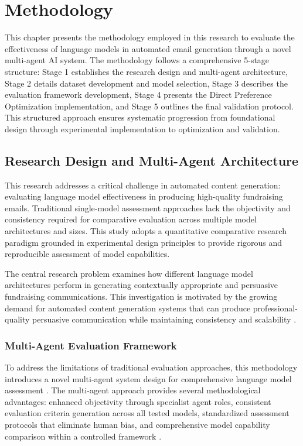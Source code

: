 \chapter{Methodology}
\label{sec:methodology}

This chapter presents the methodology employed in this research to evaluate the effectiveness of language models in automated email generation through a novel multi-agent AI system. The methodology follows a comprehensive 5-stage structure: Stage 1 establishes the research design and multi-agent architecture, Stage 2 details dataset development and model selection, Stage 3 describes the evaluation framework development, Stage 4 presents the Direct Preference Optimization implementation, and Stage 5 outlines the final validation protocol. This structured approach ensures systematic progression from foundational design through experimental implementation to optimization and validation.

\section{Research Design and Multi-Agent Architecture}
\label{sec:research-design-architecture}

This research addresses a critical challenge in automated content generation: evaluating language model effectiveness in producing high-quality fundraising emails. Traditional single-model assessment approaches lack the objectivity and consistency required for comparative evaluation across multiple model architectures and sizes. This study adopts a quantitative comparative research paradigm grounded in experimental design principles to provide rigorous and reproducible assessment of model capabilities.

The central research problem examines how different language model architectures perform in generating contextually appropriate and persuasive fundraising communications. This investigation is motivated by the growing demand for automated content generation systems that can produce professional-quality persuasive communication while maintaining consistency and scalability \cite{murakami2023nlg_advertising, zheng2023click_controllable}.

\subsection{Multi-Agent Evaluation Framework}

To address the limitations of traditional evaluation approaches, this methodology introduces a novel multi-agent system design for comprehensive language model assessment \cite{guo2024llm_multiagent, yan2025beyond_selftalk}. The multi-agent approach provides several methodological advantages: enhanced objectivity through specialist agent roles, consistent evaluation criteria generation across all tested models, standardized assessment protocols that eliminate human bias, and comprehensive model capability comparison within a controlled framework \cite{yehudai2025survey_llm_agents, ma2024agentboard}.

